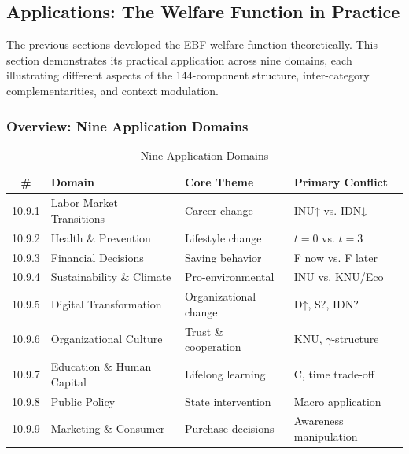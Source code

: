 \subsection{Applications: The Welfare Function in Practice}
\label{subsec:applications}


The previous sections developed the EBF welfare function theoretically.
This section demonstrates its practical application across nine domains,
each illustrating different aspects of the 144-component structure,
inter-category complementarities, and context modulation.

\subsubsection{Overview: Nine Application Domains}

\begin{table}[htbp]
\centering
\caption{Nine Application Domains}
\label{tab:nine-domains}
\renewcommand{\arraystretch}{1.3}
\begin{tabular}{@{}clll@{}}
\toprule
\textbf{\#} & \textbf{Domain} & \textbf{Core Theme} & \textbf{Primary Conflict} \\
\midrule
10.9.1 & Labor Market Transitions & Career change & INU↑ vs. IDN↓ \\
10.9.2 & Health \& Prevention & Lifestyle change & $t=0$ vs. $t=3$ \\
10.9.3 & Financial Decisions & Saving behavior & F now vs. F later \\
10.9.4 & Sustainability \& Climate & Pro-environmental & INU vs. KNU/Eco \\
10.9.5 & Digital Transformation & Organizational change & D↑, S?, IDN? \\
10.9.6 & Organizational Culture & Trust \& cooperation & KNU, $\gamma$-structure \\
10.9.7 & Education \& Human Capital & Lifelong learning & C, time trade-off \\
10.9.8 & Public Policy & State intervention & Macro application \\
10.9.9 & Marketing \& Consumer & Purchase decisions & Awareness manipulation \\
\bottomrule
\end{tabular}
\end{table}

